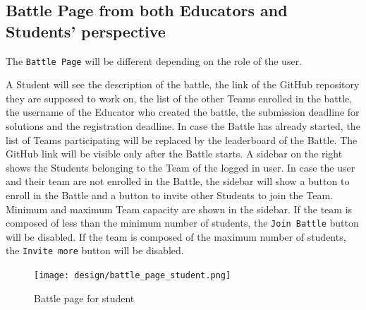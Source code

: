 \subsection*{Battle Page from both Educators and Students' perspective}
\label{subsec: battle_page}%
The \verb|Battle Page| will be different depending on the role of the user.

A Student will see the description of the battle, the link of the GitHub repository they are supposed to work on, the list of the other Teams enrolled in the battle,
 the username of the Educator who created the battle, the submission deadline for solutions and the registration deadline.
In case the Battle has already started, the list of Teams participating will be replaced by the leaderboard of the Battle.
The GitHub link will be visible only after the Battle starts.
A sidebar on the right shows the Students belonging to the Team of the logged in user.
In case the user and their team are not enrolled in the Battle, the sidebar will show a button to enroll in the Battle and a button to invite other Students to join the Team.
Minimum and maximum Team capacity are shown in the sidebar.
If the team is composed of less than the minimum number of students, the \verb|Join Battle| button will be disabled.
If the team is composed of the maximum number of students, the \verb|Invite more| button will be disabled.
\begin{figure} [H]
    \begin{center}
        \texttt{[image: design/battle\_page\_student.png]}
        \caption{Battle page for student}
        \label{fig: battle_page_student}
    \end{center}
\end{figure}


